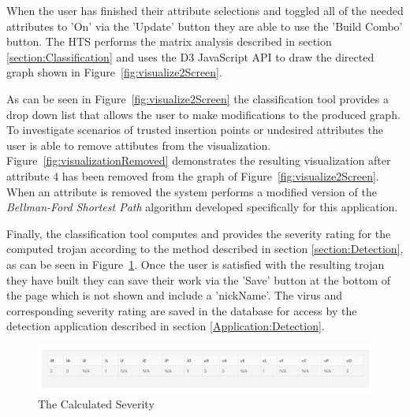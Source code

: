 When the user has finished their attribute selections and toggled all of the needed attributes to 'On' via the 'Update' button they are able to use the 'Build Combo' button. The HTS performs the matrix analysis described in section \ref{section:Classification} and uses the D3 JavaScript API \cite{D3} to draw the directed graph shown in Figure~\ref{fig:visualize2Screen}.\newline

As can be seen in Figure~\ref{fig:visualize2Screen} the classification tool provides a drop down list that allows the user to make modifications to the produced graph. To investigate scenarios of trusted insertion points or undesired attributes the user is able to remove attibutes from the visualization. Figure~\ref{fig:visualizationRemoved} demonstrates the resulting visualization after attribute 4 has been removed from the graph of Figure~\ref{fig:visualize2Screen}. When an attribute is removed the system performs a modified version of the \textit{Bellman-Ford Shortest Path} algorithm developed specifically for this application.\newline

Finally, the classification tool computes and provides the severity rating for the computed trojan according to the method described in section \ref{section:Detection}, as can be seen in Figure~\ref{fig:severityRatin}. Once the user is satisfied with the resulting trojan they have built they can save their work via the 'Save' button at the bottom of the page which is not shown and include a 'nickName'. The virus and corresponding severity rating are saved in the database for access by the detection application described in section \ref{Application:Detection}.

\begin{figure}[h]
	\centering
	\includegraphics[width=1\linewidth]{figures/severityRatin}
	\caption[The Calculated Severity]{The Calculated Severity}
	\label{fig:severityRatin}
\end{figure}
